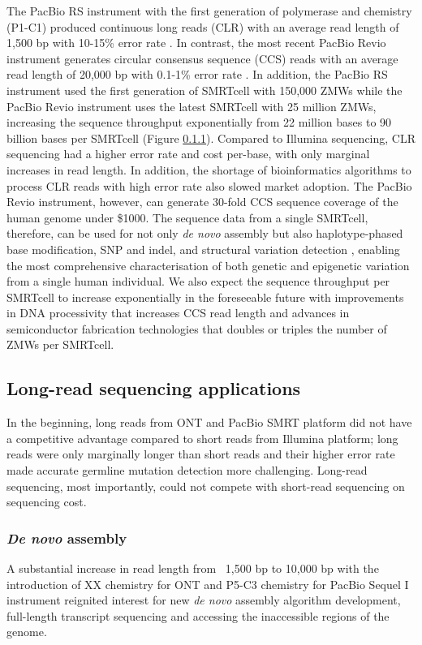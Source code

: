 The PacBio RS instrument with the first generation of polymerase and chemistry (P1-C1) produced continuous long reads (CLR) with an average read length of 1,500 bp with 10-15\% error rate \cite{}. In contrast, the most recent PacBio Revio instrument generates circular consensus sequence (CCS) reads with an average read length of 20,000 bp with 0.1-1\% error rate \cite{}. In addition, the PacBio RS instrument used the first generation of SMRTcell with 150,000 ZMWs \cite{} while the PacBio Revio instrument uses the latest SMRTcell with 25 million ZMWs, increasing the sequence throughput exponentially from 22 million bases to 90 billion bases per SMRTcell \cite{} (Figure \ref{}). Compared to Illumina sequencing, CLR sequencing had a higher error rate and cost per-base, with only marginal increases in read length. In addition, the shortage of bioinformatics algorithms to process CLR reads with high error rate also slowed market adoption. The PacBio Revio instrument, however, can generate 30-fold CCS sequence coverage of the human genome under \$1000. The sequence data from a single SMRTcell, therefore, can be used for not only \textit{de novo} assembly \cite{} but also haplotype-phased base modification\cite{}, SNP and indel, \cite{} and structural variation detection \cite{}, enabling the most comprehensive characterisation of both genetic and epigenetic variation from a single human individual. We also expect the sequence throughput per SMRTcell to increase exponentially in the foreseeable future with improvements in DNA processivity that increases CCS read length and advances in semiconductor fabrication technologies that doubles or triples the number of ZMWs per SMRTcell. 

\subsection{Long-read sequencing applications}

In the beginning, long reads from ONT and PacBio SMRT platform did not have a competitive advantage compared to short reads from Illumina platform; long reads were only marginally longer than short reads and their higher error rate made accurate germline mutation detection more challenging. Long-read sequencing, most importantly, could not compete with short-read sequencing on sequencing cost. 

\subsubsection{\textit{De novo} assembly}
A substantial increase in read length from ~1,500 bp to 10,000 bp with the introduction of XX chemistry for ONT and P5-C3 chemistry for PacBio Sequel I instrument reignited interest for new \textit{de novo} assembly algorithm development, full-length transcript sequencing and accessing the inaccessible regions of the genome.


